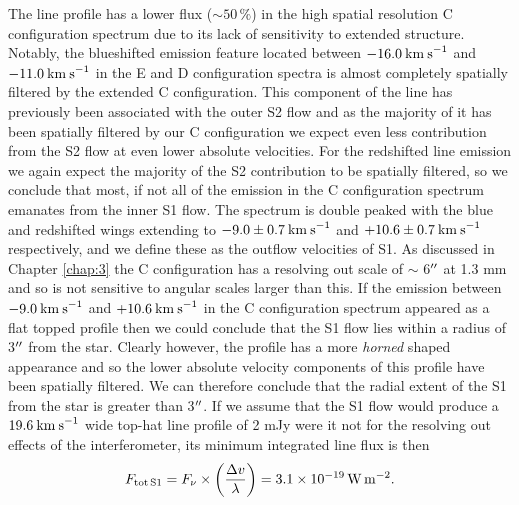 The line profile has a lower flux ($\sim 50\,\%$) in the high spatial resolution C configuration spectrum due to its lack of sensitivity to extended structure. Notably, the blueshifted emission feature located between $-16.0\>{\rm km\>s}^{-1}$ and $-11.0\>{\rm km\>s}^{-1}$ in the E and D configuration spectra is almost completely spatially filtered by the extended C configuration. This component of the line has previously been associated with the outer S2 flow \citep{huggins_1987} and as the majority of it has been spatially filtered by our C configuration we expect even less contribution from the S2 flow at even lower absolute velocities. For the redshifted line emission we again expect the majority of the S2 contribution to be spatially filtered, so we conclude that most, if not all of the emission in the C configuration spectrum emanates from the inner S1 flow. The spectrum is double peaked with the blue and redshifted wings extending to $-9.0 \pm 0.7 \>{\rm km\>s}^{-1}$ and $+10.6 \pm 0.7\>{\rm km\>s}^{-1}$ respectively, and we define these as the outflow velocities of S1. As discussed in Chapter \ref{chap:3} the C configuration has a resolving out scale of $\sim$ 6$^{\prime\prime}$ at 1.3 mm and so is not sensitive to angular scales larger than this. If the emission between $-9.0\>{\rm km\>s}^{-1}$ and $+10.6\>{\rm km\>s}^{-1}$ in the C configuration spectrum appeared as a flat topped profile then we could conclude that the S1 flow lies within a radius of 3$^{\prime\prime}$ from the star. Clearly however, the profile has a more \textit{horned} shaped appearance and so the lower absolute velocity components of this profile have been spatially filtered. We can therefore conclude that the radial extent of the S1 from the star is greater than 3$^{\prime\prime}$. If we assume that the S1 flow would produce a $19.6\>{\rm km\>s}^{-1}$ wide top-hat line profile of 2 mJy were it not for the resolving out effects of the interferometer, its minimum integrated line flux is then
\begin{equation}
F_{\rm{tot\,S1}}=F_{\nu}\times \left(\frac{\Delta v}{\lambda}\right)= 3.1 \times 10{}^{-19}\,\rm{W\,m}{}^{-2}.
\label{eq:5.1}
\end{equation}

